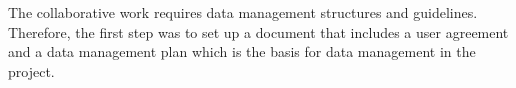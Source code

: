 The collaborative work requires data management structures and guidelines. Therefore, the first step was to set up a document that includes a user agreement and a data management plan which is the basis for data management in the project.



